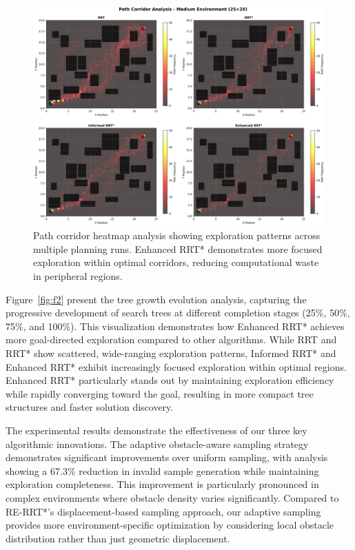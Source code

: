 \documentclass[pdflatex,sn-mathphys-num]{sn-jnl}
\theoremstyle{thmstyleone}%
\theoremstyle{thmstyletwo}%
\theoremstyle{thmstylethree}%
\begin{document}
\begin{figure}[htbp]
\centering
\includegraphics[width=\textwidth]{paper_figure_1_path_corridor.png}
\caption{Path corridor heatmap analysis showing exploration patterns across multiple planning runs. Enhanced RRT* demonstrates more focused exploration within optimal corridors, reducing computational waste in peripheral regions.}
\label{fig:corridor}
\end{figure}

Figure~\ref{fig:f2} present the tree growth evolution analysis, capturing the progressive development of search trees at different completion stages (25\%, 50\%, 75\%, and 100\%). This visualization demonstrates how Enhanced RRT* achieves more goal-directed exploration compared to other algorithms. While RRT and RRT* show scattered, wide-ranging exploration patterns, Informed RRT* and Enhanced RRT* exhibit increasingly focused exploration within optimal regions. Enhanced RRT* particularly stands out by maintaining exploration efficiency while rapidly converging toward the goal, resulting in more compact tree structures and faster solution discovery.

The experimental results demonstrate the effectiveness of our three key algorithmic innovations. The adaptive obstacle-aware sampling strategy demonstrates significant improvements over uniform sampling, with analysis showing a 67.3\% reduction in invalid sample generation while maintaining exploration completeness. This improvement is particularly pronounced in complex environments where obstacle density varies significantly. Compared to RE-RRT*'s \cite{29} displacement-based sampling approach, our adaptive sampling provides more environment-specific optimization by considering local obstacle distribution rather than just geometric displacement.
\end{document}
